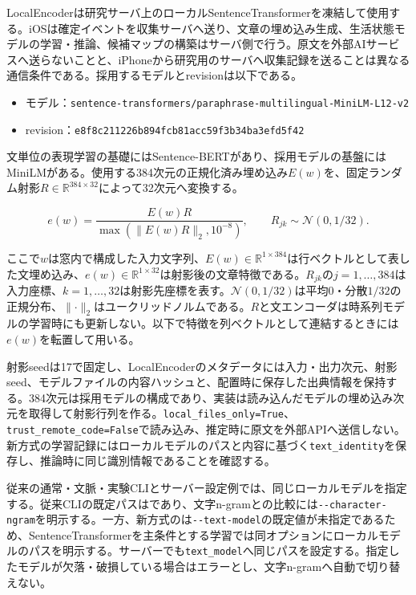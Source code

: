 LocalEncoderは研究サーバ上のローカルSentenceTransformerを凍結して使用する。iOSは確定イベントを収集サーバへ送り、文章の埋め込み生成、生活状態モデルの学習・推論、候補マップの構築はサーバ側で行う。原文を外部AIサービスへ送らないことと、iPhoneから研究用のサーバへ収集記録を送ることは異なる通信条件である。採用するモデルとrevisionは以下である。

\begin{itemize}
\item
  モデル：\texttt{sentence-transformers/paraphrase-multilingual-MiniLM-L12-v2}
\item
  revision：\texttt{e8f8c211226b894fcb81acc59f3b34ba3efd5f42}
\end{itemize}

文単位の表現学習の基礎にはSentence-BERTがあり\autocite{reimers2019sentencebert}、採用モデルの基盤にはMiniLMがある\autocite{wang2020minilm}。使用する384次元の正規化済み埋め込み\(E(w)\)を、固定ランダム射影\(R\in\mathbb R^{384\times32}\)によって32次元へ変換する。

\[
e(w)=\frac{E(w)R}{\max(\lVert E(w)R\rVert_2,10^{-8})},\qquad
R_{jk}\sim\mathcal N(0,1/32).
\]

ここで\(w\)は窓内で構成した入力文字列、\(E(w)\in\mathbb R^{1\times384}\)は行ベクトルとして表した文埋め込み、\(e(w)\in\mathbb R^{1\times32}\)は射影後の文章特徴である。\(R_{jk}\)の\(j=1,\ldots,384\)は入力座標、\(k=1,\ldots,32\)は射影先座標を表す。\(\mathcal N(0,1/32)\)は平均0・分散\(1/32\)の正規分布、\(\lVert\cdot\rVert_2\)はユークリッドノルムである。\(R\)と文エンコーダは時系列モデルの学習時にも更新しない。以下で特徴を列ベクトルとして連結するときには\(e(w)\)を転置して用いる。

射影seedは17で固定し、LocalEncoderのメタデータには入力・出力次元、射影seed、モデルファイルの内容ハッシュと、配置時に保存した出典情報を保持する。384次元は採用モデルの構成であり、実装は読み込んだモデルの埋め込み次元を取得して射影行列を作る。\texttt{local\_files\_only=True}、\texttt{trust\_remote\_code=False}で読み込み、推定時に原文を外部APIへ送信しない。新方式の学習記録にはローカルモデルのパスと内容に基づく\texttt{text\_identity}を保存し、推論時に同じ識別情報であることを確認する。

従来の通常・文脈・実験CLIとサーバー設定例では、同じローカルモデルを指定する。従来CLIの既定パスはであり、文字n-gramとの比較には\texttt{-\/-character-ngram}を明示する。一方、新方式のは\texttt{-\/-text-model}の既定値が未指定であるため、SentenceTransformerを主条件とする学習では同オプションにローカルモデルのパスを明示する。サーバーでも\texttt{text\_model}へ同じパスを設定する。指定したモデルが欠落・破損している場合はエラーとし、文字n-gramへ自動で切り替えない。

